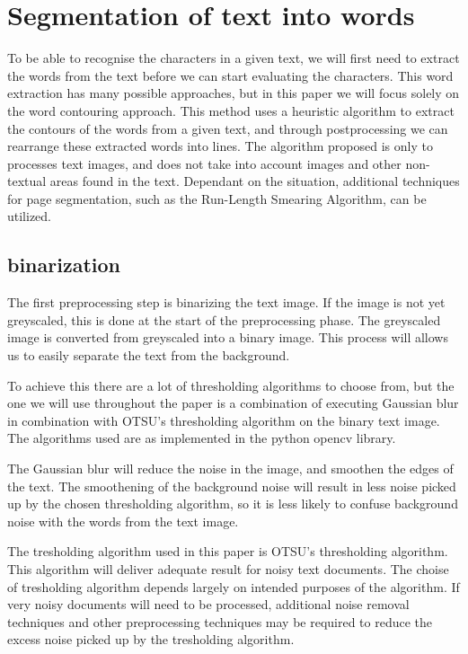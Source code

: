 \documentclass{article}
\begin{document}
\section{Segmentation of text into words}
\label{sec:segtext}

To be able to recognise the characters in a given text, we will first need to extract the words from the text before we can start evaluating the characters. This word extraction has many possible approaches, but in this paper we will focus solely on the word contouring approach.
This method uses a heuristic algorithm to extract the contours of the words from a given text, and through postprocessing we can rearrange these extracted words into lines.
The algorithm proposed is only to processes text images, and does not take into account images and other non-textual areas found in the text.
Dependant on the situation, additional techniques for page segmentation, such as the Run-Length Smearing Algorithm, can be utilized.


\subsection{binarization}
The first preprocessing step is binarizing the text image. 
If the image is not yet greyscaled, this is done at the start of the preprocessing phase.
The greyscaled image is converted from greyscaled into a binary image.
This process will allows us to easily separate the text from the background. 

To achieve this there are a lot of thresholding algorithms to choose from, but the one we will use throughout the paper is a combination of executing Gaussian blur in combination with OTSU's thresholding algorithm on the binary text image.
The algorithms used are as implemented in the python opencv library. %

The Gaussian blur will reduce the noise in the image, and smoothen the edges of the text.
The smoothening of the background noise will result in less noise picked up by the chosen thresholding algorithm, so it is less likely to confuse background noise with the words from the text image.

The tresholding algorithm used in this paper is OTSU's thresholding algorithm.
This algorithm will deliver adequate result for noisy text documents.
The choise of tresholding algorithm depends largely on intended purposes of the algorithm.
If very noisy documents will need to be processed, additional noise removal techniques and other preprocessing techniques may be required to reduce the excess noise picked up by the tresholding algorithm.
\end{document}
